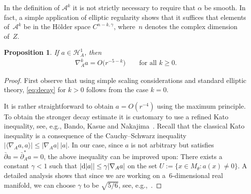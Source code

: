 \documentclass[pdftex]{sigma}
\numberwithin{equation}{section}
\newcommand{\rd}{{\rm d}}
\newcommand{\cA}{\mathcal{A}}
\newcommand{\cH}{\mathcal{H}}
\newcommand{\delbar}{\bar \del}
\newcommand{\del}{\partial}
\newtheorem{Proposition}[Theorem]{Proposition}
 { \theoremstyle{definition}
\newtheorem{Definition}[Theorem]{Definition}
\newtheorem{Remark}[Theorem]{Remark} }
\begin{document}
\begin{Remark}
  In the def\/inition of $\cA^k$ it is not strictly necessary to require
  that $\alpha$ be smooth.  In fact, a simple application of elliptic
  regularity shows that it suf\/f\/ices that elements of~$\cA^k$ be in
  the H\"older space $C^{n-k,\gamma}$, where~$n$ denotes the complex
  dimension of~$Z$.
\end{Remark}

\begin{Proposition}\label{prop:decay}
  If $a\in\cH^1_A$, then
  \begin{gather}\label{eq:decay}
    \nabla_A^k a=O\big(r^{-5-k}\big) \qquad \text{for all $k\geq 0$.}
  \end{gather}
\end{Proposition}

\begin{proof}
  First observe that using simple scaling considerations and standard
  elliptic theory, \eqref{eq:decay} for $k>0$ follows from the case
  $k=0$.

  It is rather straightforward to obtain $a=O(r^{-4})$ using the
  maximum principle.  To obtain the stronger decay estimate it is
  customary to use a ref\/ined Kato inequality, see, e.g., Bando, Kasue
  and Nakajima~\cite{Bando1989}.  Recall that the classical Kato
  inequality is a consequence of the Cauchy--Schwarz inequality
  $|\langle \nabla_A a,a\rangle |\leq |\nabla_A a|\ |a|$.  In our case, since $a$ is not arbitrary but satisf\/ies $\delbar a = \delbar_A^* a=0$, the above inequality can be improved upon:
  There exists a constant $\gamma<1$ such that $|\rd|a||\leq \gamma|\nabla_A a|$ on
  the set $U:=\{x \in M_{\theta}\colon a(x) \neq 0\}$.  A detailed
  analysis shows that since we are working on a~$6$-dimensional real
  manifold, we can choose $\gamma$ to be $\sqrt{5/6}$, see, e.g.,~\cite{Calderbank2000}.


\end{proof}
\end{document}
